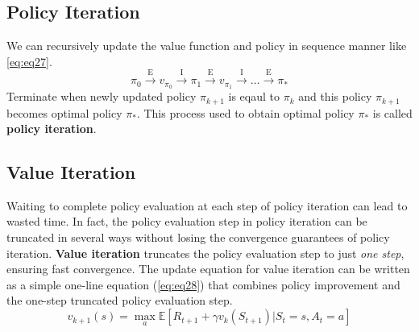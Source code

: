 \documentclass[
	10pt, %
]{article}
\newcommand{\mrm}[1]{\mathrm{#1}}
\newcommand{\mbb}[1]{\mathbb{#1}}
\newcommand{\tb}[1]{\textbf{#1}}
\newcommand{\ti}[1]{\textit{#1}}
\numberwithin{equation}{subsection} %
\begin{document}
\subsection{Policy Iteration}
We can recursively update the value function and policy in sequence manner like \cref{eq:eq27}.
\begin{equation} \label{eq:eq27}
    \pi_0 \xrightarrow{\mrm{E}} v_{\pi_0} \xrightarrow{\mrm{I}} \pi_1 \xrightarrow{\mrm{E}} v_{\pi_1} \xrightarrow{\mrm{I}} \dots \xrightarrow{\mrm{E}} \pi_*
\end{equation}
Terminate when newly updated policy $\pi_{k+1}$ is eqaul to $\pi_k$ and this policy $\pi_{k+1}$ becomes optimal policy $\pi_*$. This process used to obtain optimal policy $\pi_*$ is called \tb{policy iteration}.

\subsection{Value Iteration}
Waiting to complete policy evaluation at each step of policy iteration can lead to wasted time. In fact, the policy evaluation step in policy iteration can be truncated in several ways without losing the convergence guarantees of policy iteration. \tb{Value iteration} truncates the policy evaluation step to just \ti{one step}, ensuring fast convergence. The update equation for value iteration can be written as a simple one-line equation (\cref{eq:eq28}) that combines policy improvement and the one-step truncated policy evaluation step.
\begin{equation} \label{eq:eq28}
    v_{k+1}(s) = \max_a \mbb{E} [R_{t+1} + \gamma v_k(S_{t+1}) | S_t=s, A_t=a]
\end{equation}
\end{document}
